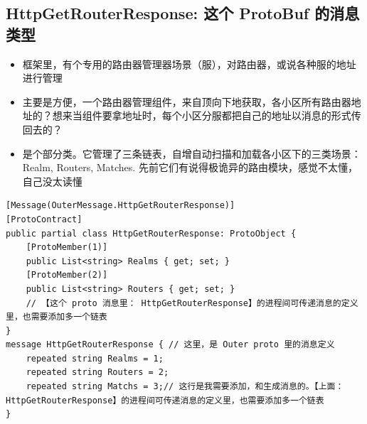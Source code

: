 \documentclass[9pt, b5paper]{article}
\begin{document}
\subsection{HttpGetRouterResponse: 这个 ProtoBuf 的消息类型}
\label{sec-7-11}
\begin{itemize}
\item 框架里，有个专用的路由器管理器场景（服），对路由器，或说各种服的地址进行管理
\item 主要是方便，一个路由器管理组件，来自顶向下地获取，各小区所有路由器地址的？想来当组件要拿地址时，每个小区分服都把自己的地址以消息的形式传回去的？
\item 是个部分类。它管理了三条链表，自增自动扫描和加载各小区下的三类场景：Realm, Routers, Matches. 先前它们有说得极诡异的路由模块，感觉不太懂，自己没太读懂
\end{itemize}
\begin{verbatim}
[Message(OuterMessage.HttpGetRouterResponse)]
[ProtoContract]
public partial class HttpGetRouterResponse: ProtoObject {
    [ProtoMember(1)]
    public List<string> Realms { get; set; }
    [ProtoMember(2)]
    public List<string> Routers { get; set; }
    // 【这个 proto 消息里： HttpGetRouterResponse】的进程间可传递消息的定义里，也需要添加多一个链表
}
message HttpGetRouterResponse { // 这里，是 Outer proto 里的消息定义
    repeated string Realms = 1;
    repeated string Routers = 2;
    repeated string Matchs = 3;// 这行是我需要添加，和生成消息的。【上面： HttpGetRouterResponse】的进程间可传递消息的定义里，也需要添加多一个链表
}
\end{verbatim}
\end{document}
